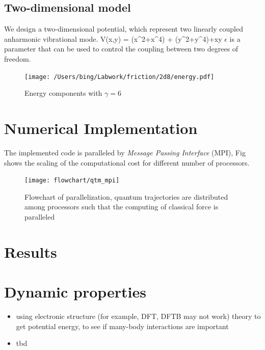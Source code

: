 \documentclass[11pt]{revtex4}
\begin{document}
\subsection{Two-dimensional model}
We design a two-dimensional potential, which represent two linearly coupled anharmonic vibrational mode. 
\be V(x,y) =  (x^2+x^4) +  (y^2+y^4)+\epsilon xy  \ee 
$\epsilon$ is a parameter that can be used to control the coupling between two degrees of freedom.
 
\begin{figure}[htbp]
\texttt{[image: /Users/bing/Labwork/friction/2d8/energy.pdf]}
\caption{Energy components with $\gamma = 6$}
\label{fig:traj_1d}
\end{figure}


\section{Numerical Implementation}
The implemented code is paralleled by \textit{Message Passing Interface} (MPI), Fig \cite{fig:scale} shows the scaling of the computational cost for different number of processors.
\begin{figure}
	\texttt{[image: flowchart/qtm\_mpi]}
	\caption{Flowchart of parallelization, quantum trajectories are distributed among processors such that the computing of classical force is paralleled} 
\end{figure}

\section{Results}

\section{Dynamic properties}
\begin{itemize}
  \item using electronic structure (for example, DFT, DFTB may not work)  theory to get potential energy, to see if many-body interactions are important 
  \item  tbd
\end{itemize}
\end{document}
